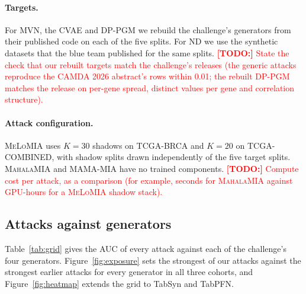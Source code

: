 \documentclass[webpdf,contemporary,large]{oup-authoring-template}
\newif\ifdraft \drafttrue
\newcommand{\annot}[3]{\ifdraft\textcolor{#1}{\textbf{[#2:]} #3}\fi}
\newcommand{\todo}[1]{\annot{red}{TODO}{#1}}
\newcommand{\mahala}{\textsc{MahalaMIA}}
\newcommand{\melo}{\textsc{MeLoMIA}}
\newcommand{\mama}{\textsc{MAMA-MIA}}
\begin{document}
\paragraph{Targets.}
For MVN, the CVAE and DP-PGM we rebuild the challenge's generators from their published code on each of the five splits. For ND we use the synthetic datasets that the blue team published for the same splits.
\todo{State the check that our rebuilt targets match the challenge's releases (the generic attacks reproduce the CAMDA 2026 abstract's rows within 0.01; the rebuilt DP-PGM matches the release on per-gene spread, distinct values per gene and correlation structure).}

\paragraph{Attack configuration.}
\melo{} uses $K = 30$ shadows on TCGA-BRCA and $K = 20$ on TCGA-COMBINED, with shadow splits drawn independently of the five target splits. \mahala{} and \mama{} have no trained components.
\todo{Compute cost per attack, as a comparison (for example, seconds for \mahala{} against GPU-hours for a \melo{} shadow stack).}

\subsection{Attacks against generators}
\label{sec:grid}

Table~\ref{tab:grid} gives the AUC of every attack against each of the challenge's four generators. Figure~\ref{fig:exposure} sets the strongest of our attacks against the strongest earlier attacks for every generator in all three cohorts, and Figure~\ref{fig:heatmap} extends the grid to TabSyn and TabPFN.
\end{document}
